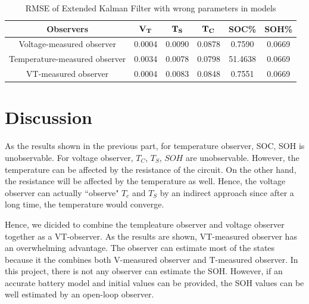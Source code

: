 \documentclass[12pt]{article}
\begin{document}
\begin{table}[H]
	\caption{RMSE of Extended Kalman Filter with wrong parameters in models}
	\vspace{-0.4cm}
	\label{tb:rmsePar}
	\centering
	\begin{tabular}{cccccc}
		\hline
		\textbf{Observers}&$\bf{V_T}$&$\bf{T_S}$&$\bf{T_C}$&\textbf{SOC\%}&\textbf{SOH\%}\\
		\hline
		Voltage-measured observer&0.0004&0.0090&0.0878&0.7590&0.0669\\
		Temperature-measured observer&0.0034&0.0078&0.0798&51.4638&0.0669\\
		VT-measured observer&0.0004&0.0083&0.0848&0.7551&0.0669\\
		\hline
	\end{tabular}
\end{table}
\section{Discussion}
As the results shown in the previous part, for temperature observer, SOC, SOH is unobservable. For voltage observer, $T_C$, $T_S$, $SOH$ are unobservable. However, the temperature can be affected by the resistance of the circuit. On the other hand, the resistance will be affected by the temperature as well. Hence, the voltage observer can actually ``observe" $T_c$ and $T_S$ by an indirect approach since after a long time, the temperature would converge. 

Hence, we dicided to combine the templeature observer and voltage observer together as a VT-observer. As the results are shown, VT-measured observer has an overwhelming advantage. The observer can estimate most of the states because it the combines both V-measured observer and T-measured observer. In this project, there is not any observer can estimate the SOH. However, if an accurate battery model and initial values can be provided, the SOH values can be well estimated by an open-loop observer.
\end{document}
